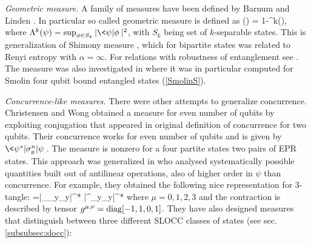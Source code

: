 \documentclass[twocolumn,aps,rmp]{revtex4}
\begin{document}
{\it Geometric measure.}
A family of measures have been defined by Barnum and Linden \cite{BarnumL2001-multi}.
In particular so called geometric measure is defined as
\be
\eg(\psi) = 1-\Lambda^k(\psi),
\ee
where $\Lambda^k(\psi)=\sup_{\phi\in S_k}|\<\psi|\phi\>|^2$, with $S_k$ being set of $k$-separable states.
This is generalization of Shimony measure \cite{Shimony1995-miara}, which for bipartite states was related to Renyi entropy with $\alpha=\infty$.
For relations with robustness of entanglement see \cite{Cavalcanti2006-geom-rob}.
The measure was also investigated in \cite{WeiG2003-geom-em,WeiAGM2003-em-bound}
where it was in particular computed for Smolin four qubit bound entangled
states (\ref{SmolinS}).


{\it Concurrence-like measures.} There were other attempts to generalize concurrence. Christensen and
Wong \cite{WongC2000-multi} obtained a measure for even number of
qubits by exploiting conjugation that appeared in original
definition of concurrence for two qubits. Their concurrence
works for even number of qubits  and is given by $\<\psi^*|\sigma_y^n|\psi\>$.
The measure is nonzero for a four partite states two pairs of EPR states.
This approach was generalized in \cite{OsterlohS2005-filters,OsterlohS2006-filters} who
analysed systematically possible quantities built out of antilinear
operations, also of higher order in $\psi$ than concurrence. For example,
they obtained the following nice representation for
3-tangle:
\be
\tau=\<\psi|\sigma_\mu\ot\sigma_y\ot\sigma_y|\psi^*\>
\<\psi|\sigma^\mu\ot\sigma_y\ot\sigma_y|\psi^*\>
\ee
where $\mu=0,1,2,3$ and the contraction is described by tensor
$g^{\mu,\nu}={\rm diag}[-1,1,0,1]$.
They have also designed measures that  distinguish between three different SLOCC classes of states (see sec. \ref{subsubsec:slocc}):
\end{document}
